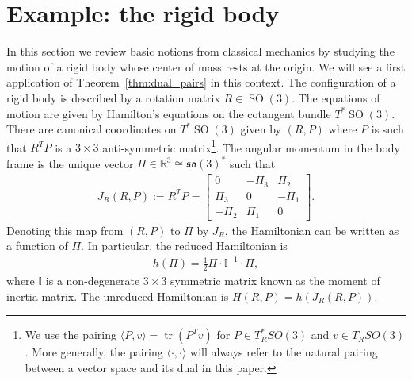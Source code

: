 \documentclass[12pt]{amsart}
\newcommand{\so}{\ensuremath{\mathfrak{so}}}
\DeclareMathOperator{\SO}{SO}
\DeclareMathOperator{\tr}{tr}
\begin{document}
\section{Example: the rigid body}
\label{sec:rigid_body}
  In this section we review basic notions from classical mechanics
by studying the motion of a rigid body whose center of mass rests
at the origin.
We will see a first application of Theorem~\ref{thm:dual_pairs}
in this context.
The configuration of a rigid body is described by a
rotation matrix $R \in \SO(3)$.
The equations of motion are given by Hamilton's equations
on the cotangent bundle $T^*\SO(3)$.
There are canonical coordinates on $T^*\SO(3)$ given by $(R,P)$
where $P$ is such that $R^TP $ is a $3 \times 3$ anti-symmetric
matrix\footnote{%
  We use the pairing $\langle P, v \rangle = \tr(P^T v)$ for
  $P \in T^*_R SO(3)$ and $v \in T_R SO(3)$. More generally, the pairing $\langle \cdot , \cdot \rangle$ will always refer to the natural pairing between a vector space and its dual in this paper.}.
The angular momentum in the body frame is the
unique vector $\Pi \in \mathbb{R}^3 \cong \so(3)^*$ such that
\begin{align*}
  J_R(R,P) := R^TP = \begin{bmatrix}
    0 & -\Pi_3 & \Pi_2 \\
    \Pi_3 & 0 & -\Pi_1 \\
    -\Pi_2 & \Pi_1 & 0 
    \end{bmatrix}.
\end{align*}
Denoting this map from $(R,P)$ to $\Pi$ by $J_R$,
the Hamiltonian can be written as a function
of $\Pi$.  In particular, the reduced Hamiltonian is
\begin{align*}
  h(\Pi) = \frac{1}{2}\Pi \cdot \mathbb{I}^{-1} \cdot \Pi,
\end{align*}
where $\mathbb{I}$ is a non-degenerate $3\times 3$ symmetric matrix
known as the moment of inertia matrix.
The unreduced Hamiltonian is $H(R,P) = h(J_R(R,P))$.
\end{document}

